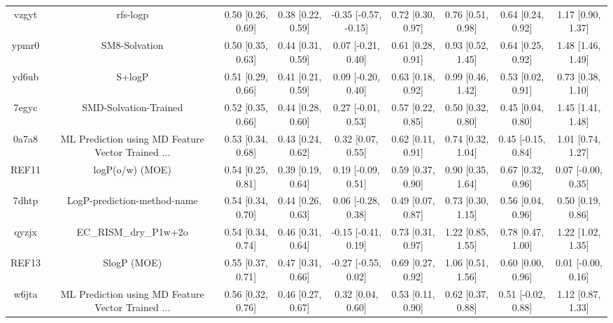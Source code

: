 \documentclass{article}
\begin{document}
\begin{center}
\begin{longtable}{|ccccccccc|}
 vzgyt &                                           rfs-logp &  0.50 [0.26, 0.69] &  0.38 [0.22, 0.59] &  -0.35 [-0.57, -0.15] &  0.72 [0.30, 0.97] &    0.76 [0.51, 0.98] &    0.64 [0.24, 0.92] &     1.17 [0.90, 1.37] \\
 ypmr0 &                                      SM8-Solvation &  0.50 [0.35, 0.63] &  0.44 [0.31, 0.59] &    0.07 [-0.21, 0.40] &  0.61 [0.28, 0.91] &    0.93 [0.52, 1.45] &    0.64 [0.25, 0.92] &     1.48 [1.46, 1.49] \\
 yd6ub &                                             S+logP &  0.51 [0.29, 0.66] &  0.41 [0.21, 0.59] &    0.09 [-0.20, 0.40] &  0.63 [0.18, 0.92] &    0.99 [0.46, 1.42] &    0.53 [0.02, 0.91] &     0.73 [0.38, 1.10] \\
 7egyc &                              SMD-Solvation-Trained &  0.52 [0.35, 0.66] &  0.44 [0.28, 0.60] &    0.27 [-0.01, 0.53] &  0.57 [0.22, 0.85] &    0.50 [0.32, 0.80] &    0.45 [0.04, 0.80] &     1.45 [1.41, 1.48] \\
 0a7a8 &  ML Prediction using MD Feature Vector Trained ... &  0.53 [0.34, 0.68] &  0.43 [0.24, 0.62] &     0.32 [0.07, 0.55] &  0.62 [0.11, 0.91] &    0.74 [0.32, 1.04] &   0.45 [-0.15, 0.84] &     1.01 [0.74, 1.27] \\
 REF11 &                                    logP(o/w) (MOE) &  0.54 [0.25, 0.81] &  0.39 [0.19, 0.64] &    0.19 [-0.09, 0.51] &  0.59 [0.37, 0.90] &    0.90 [0.35, 1.64] &    0.67 [0.32, 0.96] &    0.07 [-0.00, 0.35] \\
 7dhtp &                        LogP-prediction-method-name &  0.54 [0.34, 0.70] &  0.44 [0.26, 0.63] &    0.06 [-0.28, 0.38] &  0.49 [0.07, 0.87] &    0.73 [0.30, 1.15] &    0.56 [0.04, 0.96] &     0.50 [0.19, 0.86] \\
 qyzjx &                              EC\_RISM\_dry\_P1w+2o &  0.54 [0.34, 0.74] &  0.46 [0.31, 0.64] &   -0.15 [-0.41, 0.19] &  0.73 [0.31, 0.97] &    1.22 [0.85, 1.55] &    0.78 [0.47, 1.00] &     1.22 [1.02, 1.35] \\
 REF13 &                                        SlogP (MOE) &  0.55 [0.37, 0.71] &  0.47 [0.31, 0.66] &   -0.27 [-0.55, 0.02] &  0.69 [0.27, 0.92] &    1.06 [0.51, 1.56] &    0.60 [0.00, 0.96] &    0.01 [-0.00, 0.16] \\
 w6jta &  ML Prediction using MD Feature Vector Trained ... &  0.56 [0.32, 0.76] &  0.46 [0.27, 0.67] &     0.32 [0.04, 0.60] &  0.53 [0.11, 0.90] &    0.62 [0.37, 0.88] &   0.51 [-0.02, 0.88] &     1.12 [0.87, 1.33] \\

\end{longtable}
\end{center}
\end{document}
